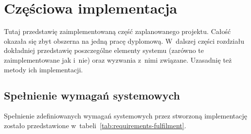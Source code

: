 


\section{Częściowa implementacja}
Tutaj przedstawię zaimplementowaną część zaplanowanego projektu. Całość okazała się zbyt obszerna na jedną pracę dyplomową. W~dalszej części rozdziału dokładniej przedstawię poszczególne elementy systemu (zarówno te zaimplementowane jak i~nie) oraz wyzwania z~nimi związane. Uzasadnię też metody ich implementacji.

\subsection{Spełnienie wymagań systemowych}
Spełnienie zdefiniowanych wymagań systemowych przez stworzoną implementację zostało przedstawione w~tabeli~\ref{tab:requirements-fulfilment}.

